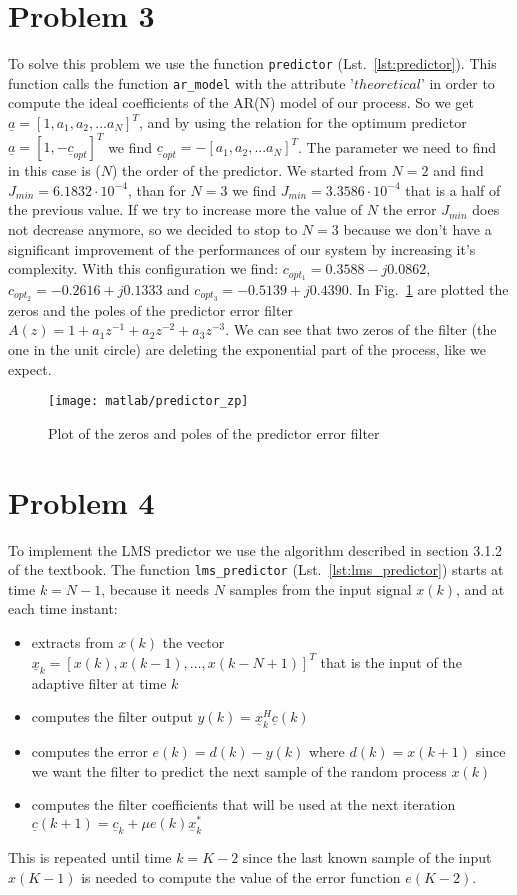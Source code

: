 \documentclass{article}
\newcommand{\inlinecode}[1]{\lstinline[basicstyle=\ttfamily,
    keywordstyle={},
    stringstyle={},
    commentstyle={\itshape}]{#1}}
\renewcommand{\vec}[1]{\underline{#1}}
\begin{document}
\section*{Problem 3}
To solve this problem we use the function \inlinecode{predictor} (Lst.~\ref{lst:predictor}). This function calls the function \inlinecode{ar_model} with the attribute '$theoretical$' in order to compute the ideal coefficients of the AR(N) model of our process. So we get $ \vec{a} = [1, a_1, a_2,...a_N]^T $, and by using the relation for the optimum predictor $ \vec{a} = [1,-\vec{c}_{opt}]^T $ we find $ \vec{c}_{opt} = -[a_1, a_2,...a_N]^T$. The parameter we need to find in this case is ($N$) the order of the predictor. We started from $N=2$ and find $J_{min} = 6.1832\cdot10^{-4}$, than for $N=3$ we find $J_{min} = 3.3586\cdot10^{-4}$ that is a half of the previous value. If we try to increase more the value of $N$ the error $J_{min}$ does not decrease anymore, so we decided to stop to $N=3$ because we don't have a significant improvement of the performances of our system by increasing it's complexity.
With this configuration we find: $c_{opt_1} = 0.3588 -j0.0862$,  $c_{opt_2} = -0.2616 +j0.1333$ and $c_{opt_3} = -0.5139 +j0.4390$.
\newline In Fig.~\ref{plot:predictor_zp} are plotted the zeros and the poles of the predictor error filter $A(z) = 1+a_1 z^{-1} + a_2 z^{-2} + a_3 z^{-3}$.
We can see that two zeros of the filter (the one in the unit circle) are deleting the exponential part of the process, like we expect. 
\begin{figure}[htbp]
  \centering
  \texttt{[image: matlab/predictor\_zp]}
  \caption{Plot of the zeros and poles of the predictor error filter}
  \label{plot:predictor_zp}
\end{figure}
\section*{Problem 4}
To implement the LMS predictor we use the algorithm described in
section 3.1.2 of the textbook. The function \inlinecode{lms_predictor}
(Lst.~\ref{lst:lms_predictor}) starts at time $k=N-1$, because it
needs $N$ samples from the input signal $x(k)$, and at each
time instant:
\begin{itemize}
  \item extracts from $x(k)$ the vector $\vec{x}_k = [x(k),
    x(k-1),\dots,x(k-N+1)]^T$ that is the input of the adaptive filter
    at time $k$
  \item computes the filter output $y(k) = \vec{x}_k^H\vec{c}(k)$
  \item computes the error $e(k) = d(k) - y(k)$ where $d(k) = x(k+1)$
    since we want the filter to predict the next sample of the random
    process $x(k)$
  \item computes the filter coefficients that will be used at the next
    iteration $\vec{c}(k+1) = \vec{c}_k + \mu e(k) \vec{x}_k^*$
\end{itemize}
This is repeated until time $k = K - 2$ since the last known sample of
the input $x(K-1)$ is needed to compute the value of the error
function $e(K-2)$.
\end{document}
